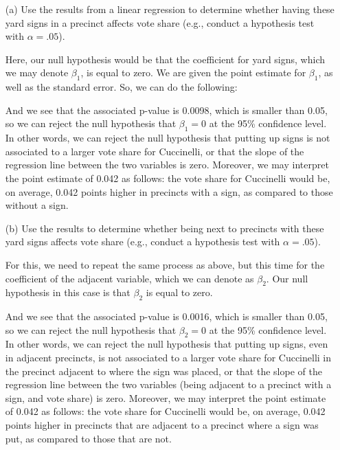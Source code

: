 \documentclass[12pt,letterpaper]{article}
\begin{document}
\newpage
\begin{enumerate}
	\item [(a)] Use the results from a linear regression to determine whether having these yard signs in a precinct affects vote share (e.g., conduct a hypothesis test with $\alpha = .05$).
	\vspace{0.5cm}
	
	Here, our null hypothesis would be that the coefficient for yard signs, which we may denote $\beta_1$, is equal to zero. We are given the point estimate for $\beta_1$, as well as the standard error. 
	So, we can do the following: 
	
	 	
	
	And we see that the associated p-value is 0.0098, which is smaller than 0.05, so we can reject the null hypothesis that $\beta_1 = 0 $ at the 95\% confidence level. In other words, we can reject the null hypothesis that putting up signs is not associated to a larger vote share for Cuccinelli, or that the slope of the regression line between the two variables is zero. Moreover, we may interpret the point estimate of 0.042 as follows: the vote share for Cuccinelli would be, on average, 0.042 points higher in precincts with a sign, as compared to those without a sign. 
	
	\vspace{0.5cm}
	\item [(b)]  Use the results to determine whether being
	next to precincts with these yard signs affects vote
	share (e.g., conduct a hypothesis test with $\alpha = .05$).
	\vspace{0.5cm}
	
	For this, we need to repeat the same process as above, but this time for the coefficient of the adjacent variable, which we can denote as $\beta_2$. Our null hypothesis in this case is that $\beta_2$ is equal to zero. 
	
	 	
	
	And we see that the associated p-value is 0.0016, which is smaller than 0.05, so we can reject the null hypothesis that $\beta_2 = 0 $ at the 95\% confidence level. In other words, we can reject the null hypothesis that putting up signs, even in adjacent precincts, is not associated to a larger vote share for Cuccinelli in the precinct adjacent to where the sign was placed, or that the slope of the regression line between the two variables (being adjacent to a precinct with a sign, and vote share) is zero. Moreover, we may interpret the point estimate of 0.042 as follows: the vote share for Cuccinelli would be, on average, 0.042 points higher in precincts that are adjacent to a precinct where a sign was put, as compared to those that are not. 
	

\end{enumerate}
\end{document}
